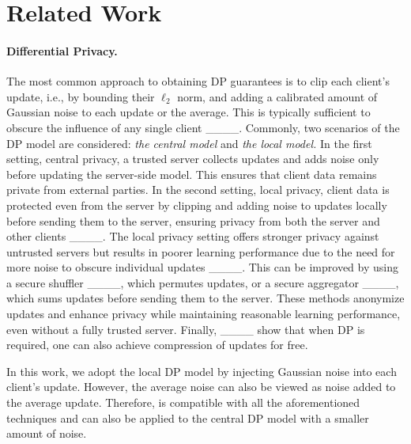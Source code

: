 \section{Related Work}
\paragraph{Differential Privacy.} The most common approach to obtaining DP guarantees is to clip each client's update, i.e., by bounding their $\ell_2$ norm, and adding a calibrated amount of Gaussian noise to each update or the average. This is typically sufficient to obscure the influence of any single client ____. Commonly, two scenarios of the DP model are considered: \textit{the central model} and \textit{the local model.} In the first setting, central privacy, a trusted server collects updates and adds noise only before updating the server-side model. This ensures that client data remains private from external parties. In the second setting, local privacy, client data is protected even from the server by clipping and adding noise to updates locally before sending them to the server, ensuring privacy from both the server and other clients ____. The local privacy setting offers stronger privacy against untrusted servers but results in poorer learning performance due to the need for more noise to obscure individual updates ____. This can be improved by using a secure shuffler ____, which permutes updates, or a secure aggregator ____, which sums updates before sending them to the server. These methods anonymize updates and enhance privacy while maintaining reasonable learning performance, even without a fully trusted server. Finally, ____ show that when DP is required, one can also achieve compression of updates for free.

In this work, we adopt the local DP model by injecting Gaussian noise into each client's update. However, the average noise can also be viewed as noise added to the average update. Therefore,  is compatible with all the aforementioned techniques and can also be applied to the central DP model with a smaller amount of noise.





